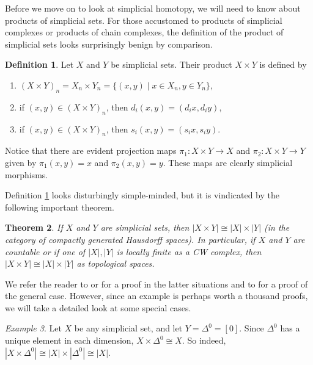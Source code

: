 \documentclass[12pt]{article}
\theoremstyle{plain}
\newtheorem{theorem}{Theorem}[section]
\theoremstyle{definition}
\newtheorem{definition}[theorem]{Definition}
\theoremstyle{remark}
\newtheorem{example}[theorem]{Example}
\begin{document}
Before we move on to  look at simplicial homotopy, we will need to know about products of simplicial sets. For those accustomed to products of simplicial complexes or products of chain complexes, the definition of the product of simplicial sets looks surprisingly benign by comparison.

\begin{definition}\label{D: product}
Let $X$ and $Y$ be simplicial sets. Their product $X\times Y$ is defined by 
\begin{enumerate}
\item $(X\times Y)_n=X_n\times Y_n=\{ (x,y)\mid x\in X_n, y\in Y_n\}$,

\item if $(x,y)\in (X\times Y)_n$, then $d_i(x,y)=(d_ix,d_iy)$,

\item if $(x,y)\in (X\times Y)_n$, then $s_i(x,y)=(s_ix,s_iy)$.
\end{enumerate}
\end{definition}

Notice that there are evident projection maps $\pi_1\colon X\times Y\to X$ and $\pi_2\colon X\times Y\to Y$ given by $\pi_1(x,y)=x$ and $\pi_2(x,y)=y$. These maps are clearly simplicial morphisms.

Definition \ref{D: product} looks disturbingly simple-minded, but it is vindicated by the following important theorem.

\begin{theorem}\label{T: product}
If $X$ and $Y$ are simplicial sets, then $|X\times Y|\cong |X|\times |Y|$ (in the category of compactly generated Hausdorff spaces). In particular, if $X$ and $Y$ are countable or if one of $|X|,|Y|$ is locally finite as a CW complex, then $|X\times Y|\cong |X|\times |Y|$ as topological spaces.
\end{theorem}
We refer the reader to \cite[Theorem 14.3]{MAY67} or \cite{Mi57} for a proof in the latter situations and to \cite[Chapter III]{GabZis} for a proof of the general case. However, since an example is perhaps worth a thousand proofs, we will take a detailed look at some special cases. 



\begin{example}
Let $X$ be any simplicial set, and let $Y=\Delta^0=[0]$. Since $\Delta^0$ has a unique element in each dimension, $X\times \Delta^0\cong X$. So indeed, $|X\times \Delta^0|\cong |X|\times |\Delta^0|\cong  |X|$. 
\end{example}
\end{document}
